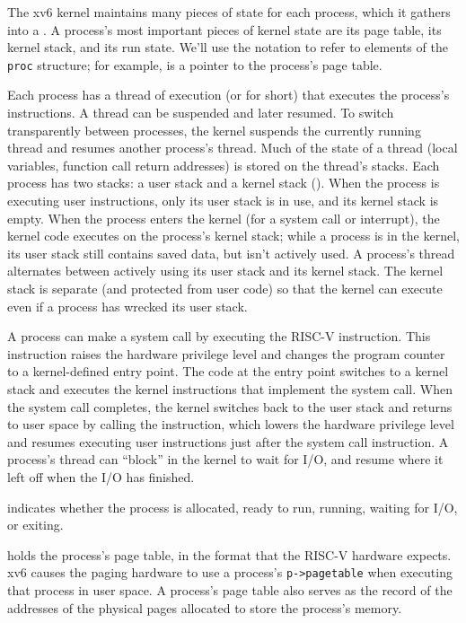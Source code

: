 The xv6 kernel maintains many pieces of state for each process,
which it gathers into a
.
A process's most important pieces of kernel state are its 
page table, its kernel stack, and its run state.
We'll use the notation
to refer to elements of the
\lstinline{proc}
structure; for example,
 is a pointer to the process's page table.

Each process has a thread of execution (or 
for short) that executes the process's instructions.
A thread can be suspended and later resumed.
To switch transparently between processes,
the kernel suspends the currently running thread and resumes another process's
thread.  Much of the state of a thread (local variables, function call return
addresses) is stored on the thread's stacks.
Each process has two stacks: a user stack and a kernel stack
().
When the process is executing user instructions, only its user stack
is in use, and its kernel stack is empty.
When the process enters the kernel (for a system call or interrupt),
the kernel code executes on the process's kernel stack; while
a process is in the kernel, its user stack still contains saved
data, but isn't actively used.
A process's thread alternates between actively using its user stack
and its kernel stack. The kernel stack is separate (and protected from
user code) so that the kernel
can execute even if a process has wrecked its user stack.

A process can make a system call by executing the RISC-V 
instruction. This instruction raises the hardware privilege level and
changes the program counter to a kernel-defined entry point.  The code
at the entry point switches to a kernel stack and executes the kernel
instructions that implement the system call.  When the system call
completes, the kernel switches back to the user stack and returns to
user space by calling the  instruction, which lowers
the hardware privilege level and resumes executing user instructions
just after the system call instruction.  A process's thread can
``block'' in the kernel to wait for I/O, and resume where it left off
when the I/O has finished.

indicates whether the process is allocated, ready
to run, running, waiting for I/O, or exiting.

holds the process's page table, in the format
that the RISC-V hardware expects.
xv6 causes the paging hardware to use a process's
\lstinline{p->pagetable}
when executing that process in user space.
A process's page table also serves as the record of the
addresses of the physical pages allocated to store the process's memory.
